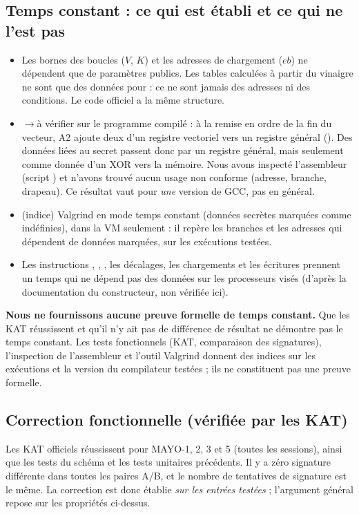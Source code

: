\subsection{Temps constant : ce qui est établi et ce qui ne l'est pas}\label{sec:tempsconst}
\begin{itemize}
\item \Pc{} Les bornes des boucles ($V$, $K$) et les adresses de chargement ($eb$) ne dépendent que de paramètres publics. Les tables calculées à partir du vinaigre ne sont que des données pour \vpshufb{} : ce ne sont jamais des adresses ni des conditions. Le code officiel a la même structure.
\item \Pc{}$\to$à vérifier sur le programme compilé : à la remise en ordre de la fin du vecteur, A2 ajoute deux  d'un registre vectoriel vers un registre général (). Des données liées au secret passent donc par un registre général, mais seulement comme donnée d'un XOR vers la mémoire. Nous avons inspecté l'assembleur (script ) et n'avons trouvé aucun usage non conforme (adresse, branche, drapeau). Ce résultat vaut pour \emph{une} version de GCC, pas en général.
\item \Pe{} (indice) Valgrind en mode temps constant (données secrètes marquées comme indéfinies), dans la VM seulement : il repère les branches et les adresses qui dépendent de données marquées, sur les exécutions testées.
\item \Hy{} Les instructions \vpshufb{}, , , les décalages, les chargements et les écritures prennent un temps qui ne dépend pas des données sur les processeurs visés (d'après la documentation du constructeur, non vérifiée ici).
\end{itemize}
\textbf{Nous ne fournissons aucune preuve formelle de temps constant.} Que les KAT réussissent et qu'il n'y ait pas de différence de résultat ne démontre pas le temps constant. Les tests fonctionnels (KAT, comparaison des signatures), l'inspection de l'assembleur et l'outil Valgrind donnent des indices sur les exécutions et la version du compilateur testées ; ils ne constituent pas une preuve formelle.

\subsection{Correction fonctionnelle (vérifiée par les KAT)}
Les KAT officiels réussissent pour MAYO-1, 2, 3 et 5 (toutes les sessions), ainsi que les tests du schéma et les tests unitaires précédents. Il y a zéro signature différente dans toutes les paires A/B, et le nombre de tentatives de signature est le même. La correction est donc établie \emph{sur les entrées testées} ; l'argument général repose sur les propriétés \Pc{} ci-dessus.

